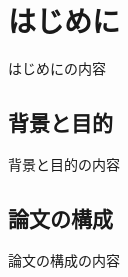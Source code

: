 \chapter{はじめに}\label{chap1}
はじめにの内容

\section{背景と目的}\label{1-1}
背景と目的の内容

\section{論文の構成}\label{1-3}
論文の構成の内容